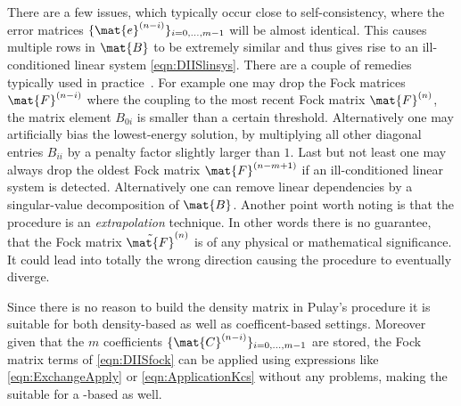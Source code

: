 There are a few issues,
which typically occur close to self-consistency,
where the error matrices $\{\mat{e}^{(n-i)}\}_{i=0,\ldots,m-1}$
will be almost identical.
This causes multiple rows in $\mat{B}$ to be extremely similar
and thus gives rise to an ill-conditioned linear system \eqref{eqn:DIISlinsys}.
There are a couple of remedies typically used in practice~\cite{Kudin2002}.
For example one may drop the Fock matrices $\mat{F}^{(n-i)}$
where the coupling to the most recent Fock matrix $\mat{F}^{(n)}$,
\ie the matrix element $B_{0i}$ is smaller than a certain threshold.
Alternatively one may artificially bias the lowest-energy solution,
by multiplying all other diagonal entries $B_{ii}$ by a penalty
factor slightly larger than $1$.
Last but not least one may always drop the oldest Fock matrix
$\mat{F}^{(n-m+1)}$ if an ill-conditioned linear system is detected.
Alternatively one can remove linear dependencies by a singular-value
decomposition of $\mat{B}$.
Another point worth noting is that the \DIIS procedure is an \emph{extrapolation}
technique.
In other words there is no guarantee,
that the Fock matrix $\tilde{\mat{F}}^{(n)}$ is of any physical
or mathematical significance.
It could lead into totally the wrong direction causing the \SCF
procedure to eventually diverge.

Since there is no reason to build the density matrix
in Pulay's \DIIS procedure
it is suitable for both density-based as well as coefficent-based \SCF settings.
Moreover given that the $m$ coefficients $\{ \mat{C}^{(n-i)} \}_{i=0,\ldots,m-1}$
are stored,
the Fock matrix terms of \eqref{eqn:DIISfock}
can be applied using expressions like \eqref{eqn:ExchangeApply}
or \eqref{eqn:ApplicationKcs} without any problems,
making the \DIIS suitable for a \contract-based \SCF as well.

